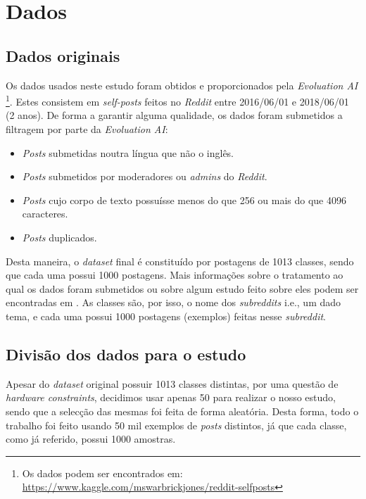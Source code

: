 \section{Dados}

\subsection{Dados originais}
Os dados usados neste estudo foram obtidos e proporcionados pela \textit{Evoluation AI} \footnote{Os dados podem ser encontrados em: \url{https://www.kaggle.com/mswarbrickjones/reddit-selfposts}}. Estes consistem em \textit{self-posts} feitos no \textit{Reddit} entre 2016/06/01 e 2018/06/01 (2 anos). De forma a garantir alguma qualidade, os dados foram submetidos a filtragem por parte da \textit{Evoluation AI}:
\begin{itemize}
    \item \textit{Posts} submetidas noutra língua que não o inglês.
    \item \textit{Posts} submetidos por moderadores ou \textit{admins} do \textit{Reddit}.
    \item \textit{Posts} cujo corpo de texto possuísse menos do que 256 ou mais do que 4096 caracteres.
    \item \textit{Posts} duplicados.
\end{itemize}

Desta maneira, o \textit{dataset} final é constituído por postagens de 1013 classes, sendo que cada uma possui 1000 postagens. Mais informações sobre o tratamento ao qual os dados foram submetidos ou sobre algum estudo feito sobre eles podem ser encontradas em \cite{data_paper}. As classes são, por isso, o nome dos \textit{subreddits} i.e., um dado tema, e cada uma possui 1000 postagens (exemplos) feitas nesse \textit{subreddit}.

\subsection{Divisão dos dados para o estudo}
\label{subsub:data_initial_division}

Apesar do \textit{dataset} original possuir 1013 classes distintas, por uma questão de \textit{hardware constraints}, decidimos usar apenas 50 para realizar o nosso estudo, sendo que a selecção das mesmas foi feita de forma aleatória. Desta forma, todo o trabalho foi feito usando 50 mil exemplos de \textit{posts} distintos, já que cada classe, como já referido, possui 1000 amostras. 

